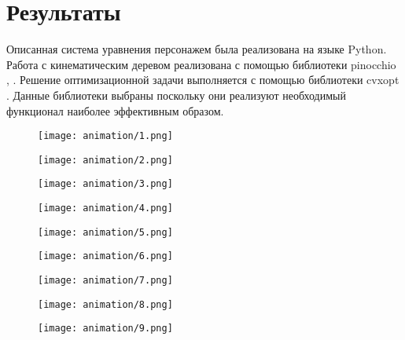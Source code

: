 \section{Результаты}

Описанная система уравнения персонажем была реализована на языке Python. Работа с кинематическим деревом реализована с помощью библиотеки pinocchio \cite{Carpentier}, \cite{Pinocchio}. Решение оптимизационной задачи выполняется с помощью библиотеки cvxopt \cite{CVXOPT}. Данные библиотеки выбраны поскольку они реализуют необходимый функционал наиболее эффективным образом.

\begin{figure}
  \hfill
  \begin{minipage}{0.326\textwidth}
    \centering
    \texttt{[image: animation/1.png]}
  \end{minipage}
  \begin{minipage}{0.326\textwidth}
    \centering
    \texttt{[image: animation/2.png]}
  \end{minipage}
  \begin{minipage}{0.326\textwidth}
    \centering
    \texttt{[image: animation/3.png]}
  \end{minipage}
  \vfill
  \hfill
  \begin{minipage}{0.326\textwidth}
    \centering
    \texttt{[image: animation/4.png]}
  \end{minipage}
  \begin{minipage}{0.326\textwidth}
    \centering
    \texttt{[image: animation/5.png]}
  \end{minipage}
  \begin{minipage}{0.326\textwidth}
    \centering
    \texttt{[image: animation/6.png]}
  \end{minipage}
  \vfill
  \hfill
  \begin{minipage}{0.326\textwidth}
    \centering
    \texttt{[image: animation/7.png]}
  \end{minipage}
  \begin{minipage}{0.326\textwidth}
    \centering
    \texttt{[image: animation/8.png]}
  \end{minipage}
  \begin{minipage}{0.326\textwidth}
    \centering
    \texttt{[image: animation/9.png]}
  \end{minipage}
  \vfill
  \hfill
  \begin{minipage}{0.326\textwidth}

\end{minipage}
\end{figure}
